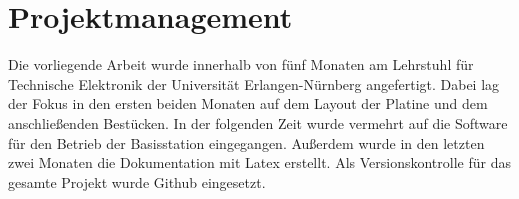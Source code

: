\section{Projektmanagement}
Die vorliegende Arbeit wurde innerhalb von fünf Monaten am Lehrstuhl für Technische Elektronik der Universität Erlangen-Nürnberg angefertigt. Dabei lag der Fokus in den ersten beiden Monaten auf dem Layout der Platine und dem anschließenden Bestücken. In der folgenden Zeit wurde vermehrt auf die Software für den Betrieb der Basisstation eingegangen. Außerdem wurde in den letzten zwei Monaten die Dokumentation mit Latex erstellt. Als Versionskontrolle für das gesamte Projekt wurde Github eingesetzt.

